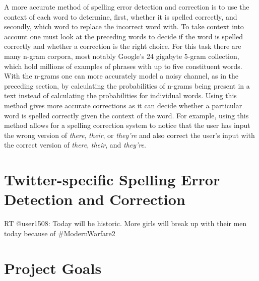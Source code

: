 A more accurate method of spelling error detection and correction is to use the context of each word to determine, first, whether it is spelled correctly, and secondly, which word to replace the incorrect word with. To take context into account one must look at the preceding words to decide if the word is spelled correctly and whether a correction is the right choice. For this task there are many n-gram corpora, most notably Google's 24 gigabyte 5-gram collection, which hold millions of examples of phrases with up to five constituent words. With the n-grams one can more accurately model a noisy channel, as in the preceding section, by calculating the probabilities of n-grams being present in a text instead of calculating the probabilities for individual words. Using this method gives more accurate corrections as it can decide whether a particular word is spelled correctly given the context of the word. For example, using this method allows for a spelling correction system to notice that the user has input the wrong version of \emph{there}, \emph{their}, or \emph{they're} and also correct the user's input with the correct version of \emph{there}, \emph{their}, and \emph{they're}.

\section{Twitter-specific Spelling Error Detection and Correction}

RT @user1508: Today will be historic. More girls will break up with their men today because of #ModernWarfare2

\section{Project Goals}